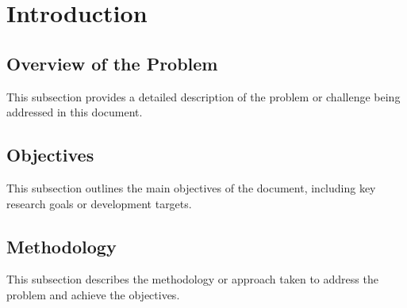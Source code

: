 % 

\section{Introduction}  %

\subsection{Overview of the Problem}
This subsection provides a detailed description of the problem or challenge being addressed in this document.

\subsection{Objectives}
This subsection outlines the main objectives of the document, including key research goals or development targets.

\subsection{Methodology}
This subsection describes the methodology or approach taken to address the problem and achieve the objectives.

\endinput  %
